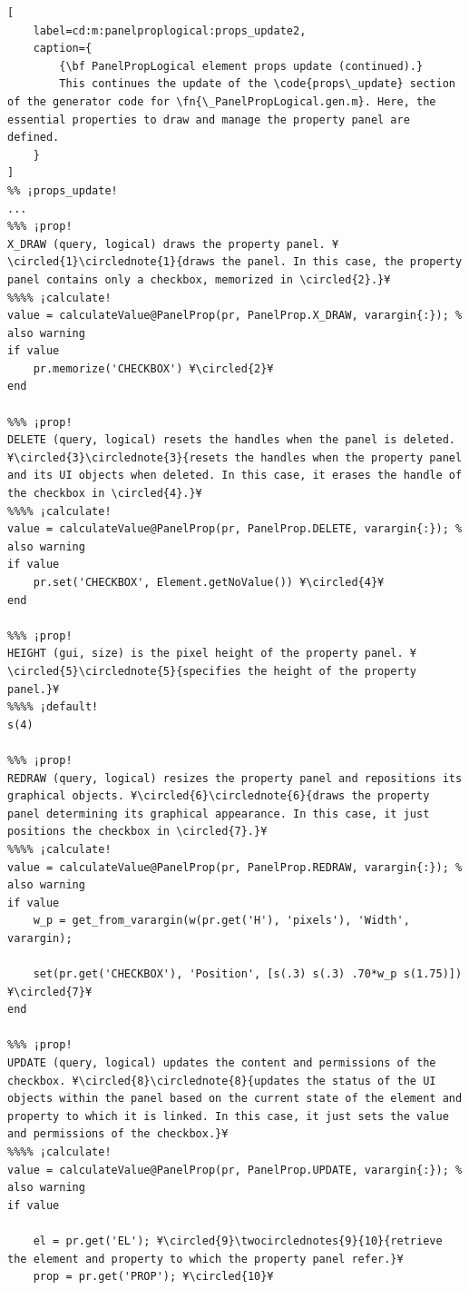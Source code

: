 \documentclass{tufte-handout}
\begin{document}
\begin{lstlisting}[
	label=cd:m:panelproplogical:props_update2,
	caption={
		{\bf PanelPropLogical element props update (continued).}
		This continues the update of the \code{props\_update} section of the generator code for \fn{\_PanelPropLogical.gen.m}. Here, the essential properties to draw and manage the property panel are defined.
	}
]
%% ¡props_update!
...
%%% ¡prop!
X_DRAW (query, logical) draws the property panel. ¥\circled{1}\circlednote{1}{draws the panel. In this case, the property panel contains only a checkbox, memorized in \circled{2}.}¥
%%%% ¡calculate!
value = calculateValue@PanelProp(pr, PanelProp.X_DRAW, varargin{:}); % also warning
if value
	pr.memorize('CHECKBOX') ¥\circled{2}¥
end

%%% ¡prop!
DELETE (query, logical) resets the handles when the panel is deleted. ¥\circled{3}\circlednote{3}{resets the handles when the property panel and its UI objects when deleted. In this case, it erases the handle of the checkbox in \circled{4}.}¥
%%%% ¡calculate!
value = calculateValue@PanelProp(pr, PanelProp.DELETE, varargin{:}); % also warning
if value
	pr.set('CHECKBOX', Element.getNoValue()) ¥\circled{4}¥
end

%%% ¡prop!
HEIGHT (gui, size) is the pixel height of the property panel. ¥\circled{5}\circlednote{5}{specifies the height of the property panel.}¥
%%%% ¡default!
s(4)

%%% ¡prop!
REDRAW (query, logical) resizes the property panel and repositions its graphical objects. ¥\circled{6}\circlednote{6}{draws the property panel determining its graphical appearance. In this case, it just positions the checkbox in \circled{7}.}¥
%%%% ¡calculate!
value = calculateValue@PanelProp(pr, PanelProp.REDRAW, varargin{:}); % also warning
if value
	w_p = get_from_varargin(w(pr.get('H'), 'pixels'), 'Width', varargin);

	set(pr.get('CHECKBOX'), 'Position', [s(.3) s(.3) .70*w_p s(1.75)]) ¥\circled{7}¥
end

%%% ¡prop!
UPDATE (query, logical) updates the content and permissions of the checkbox. ¥\circled{8}\circlednote{8}{updates the status of the UI objects within the panel based on the current state of the element and property to which it is linked. In this case, it just sets the value and permissions of the checkbox.}¥
%%%% ¡calculate!
value = calculateValue@PanelProp(pr, PanelProp.UPDATE, varargin{:}); % also warning
if value

	el = pr.get('EL'); ¥\circled{9}\twocirclednotes{9}{10}{retrieve the element and property to which the property panel refer.}¥
	prop = pr.get('PROP'); ¥\circled{10}¥


\end{lstlisting}
\end{document}
